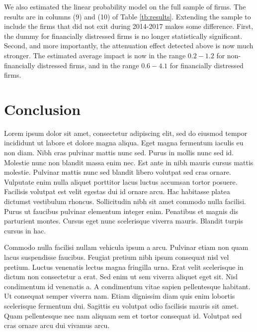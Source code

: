 \documentclass[12pt]{article}
\begin{document}
We also estimated the linear probability model on the full sample of firms. 
The results are in columns (9) and (10) of Table \ref{tb:results}. 
Extending the sample to include the firms that did not exit during 2014-2017 makes some difference. 
First, the dummy for financially distressed firms is no longer statistically significant. 
Second, and more importantly, the attenuation effect detected above is now much stronger. 
The estimated average impact is now in the range $0.2-1.2$ for non-financially distressed firms, and in the range $0.6-4.1$ for financially distressed firms.




\section{Conclusion} \label{sec:conclusion}

Lorem ipsum dolor sit amet, consectetur adipiscing elit, sed do eiusmod tempor incididunt ut labore et dolore magna aliqua. Eget magna fermentum iaculis eu non diam. Nibh cras pulvinar mattis nunc sed. Purus in mollis nunc sed id. Molestie nunc non blandit massa enim nec. Est ante in nibh mauris cursus mattis molestie. Pulvinar mattis nunc sed blandit libero volutpat sed cras ornare. Vulputate enim nulla aliquet porttitor lacus luctus accumsan tortor posuere. Facilisis volutpat est velit egestas dui id ornare arcu. Hac habitasse platea dictumst vestibulum rhoncus. Sollicitudin nibh sit amet commodo nulla facilisi. Purus ut faucibus pulvinar elementum integer enim. Penatibus et magnis dis parturient montes. Cursus eget nunc scelerisque viverra mauris. Blandit turpis cursus in hac.

Commodo nulla facilisi nullam vehicula ipsum a arcu. Pulvinar etiam non quam lacus suspendisse faucibus. Feugiat pretium nibh ipsum consequat nisl vel pretium. Luctus venenatis lectus magna fringilla urna. Erat velit scelerisque in dictum non consectetur a erat. Sed enim ut sem viverra aliquet eget sit. Nisl condimentum id venenatis a. A condimentum vitae sapien pellentesque habitant. Ut consequat semper viverra nam. Etiam dignissim diam quis enim lobortis scelerisque fermentum dui. Sagittis eu volutpat odio facilisis mauris sit amet. Quam pellentesque nec nam aliquam sem et tortor consequat id. Volutpat sed cras ornare arcu dui vivamus arcu.





\end{document}
